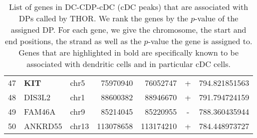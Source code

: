 \begin{table}
\begin{tabular}{rllrrcr}
47 & \textbf{KIT} & chr5 & 75970940 & 76052747 & + & 794.821851563 \\
48 & DIS3L2 & chr1 & 88600382 & 88946670 & + & 791.794724159 \\
49 & FAM46A & chr9 & 85214045 & 85220955 & - & 788.360435944 \\
50 & ANKRD55 & chr13 & 113078658 & 113174210 & + & 784.448973727 \\
 \end{tabular}
\caption[List of genes associated with cDC peaks]{List of genes in DC-CDP-cDC (cDC peaks) that are associated with DPs called by THOR.
We rank the genes by the $p$-value of the assigned DP.
For each gene, we give the chromosome, the start and end positions, the strand as well as the $p$-value the gene is assigned to.
Genes that are highlighted in bold are specifically known to be associated with dendritic cells and in particular cDC cells.}
\label{tab_res_dc_cDC_gene_list}
\end{table}


\clearpage
\newpage

